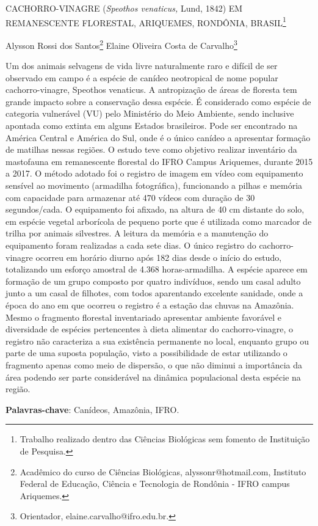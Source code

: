 \documentclass[article,12pt,onesidea,4paper,english,brazil]{abntex2}
\begin{document}
	
	
	\frenchspacing 
	
	\begin{center}
		\LARGE CACHORRO-VINAGRE (\textit{Speothos venaticus,} Lund, 1842) EM REMANESCENTE FLORESTAL, ARIQUEMES, RONDÔNIA, BRASIL\footnote{Trabalho realizado dentro das Ciências Biológicas sem fomento de Instituição de Pesquisa.}
		
		\normalsize
		Alysson Rossi dos Santos\footnote{Acadêmico do curso de Ciências Biológicas, alyssonr@hotmail.com, Instituto Federal de Educação, Ciência e Tecnologia de Rondônia - IFRO campus Ariquemes.} 
		Elaine Oliveira Costa de Carvalho\footnote{Orientador, elaine.carvalho@ifro.edu.br.} 
		
	\end{center}
	
	\noindent Um dos animais selvagens de vida livre naturalmente raro e difícil de ser observado em campo é a espécie de canídeo neotropical de nome popular cachorro-vinagre, Speothos venaticus. A antropização de áreas de floresta tem grande impacto sobre a conservação dessa espécie. É considerado como espécie de categoria vulnerável (VU) pelo Ministério do Meio Ambiente, sendo inclusive apontada como extinta em alguns Estados brasileiros. Pode ser encontrado na América Central e América do Sul, onde é o único canídeo a apresentar formação de matilhas nessas regiões. O estudo teve como objetivo realizar inventário da mastofauna em remanescente florestal do IFRO Campus Ariquemes, durante 2015 a 2017. O método adotado foi o registro de imagem em vídeo com equipamento sensível ao movimento (armadilha fotográfica), funcionando a pilhas e memória com capacidade para armazenar até 470 vídeos com duração de 30 segundos/cada. O equipamento foi afixado, na altura de 40 cm distante do solo, em espécie vegetal arborícola de pequeno porte que é utilizada como marcador de trilha por animais silvestres. A leitura da memória e a manutenção do equipamento foram realizadas a cada sete dias. O único registro do cachorro-vinagre ocorreu em horário diurno após 182 dias desde o início do estudo, totalizando um esforço amostral de 4.368 horas-armadilha. A espécie aparece em formação de um grupo composto por quatro indivíduos, sendo um casal adulto junto a um casal de filhotes, com todos aparentando excelente sanidade, onde a época do ano em que ocorreu o registro é a estação das chuvas na Amazônia. Mesmo o fragmento florestal inventariado apresentar ambiente favorável e diversidade de espécies pertencentes à dieta alimentar do cachorro-vinagre, o registro não caracteriza a sua existência permanente no local, enquanto grupo ou parte de uma suposta população, visto a possibilidade de estar utilizando o fragmento apenas como meio de dispersão, o que não diminui a importância da área podendo ser parte considerável na dinâmica populacional desta espécie na região.
	
	\vspace{\onelineskip}
	
	\noindent
	\textbf{Palavras-chave}: Canídeos, Amazônia, IFRO.
	
\end{document}
